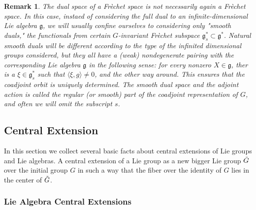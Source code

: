 \documentclass{article}
\newtheorem{rmk}{Remark}
\begin{document}
\begin{rmk}

	The dual space of a Fr\`echet space is not necessarily again a Fr\`echet space. In this case, instaed of considering the full dual to an infinite-dimensional Lie algebra $ \mathfrak{g}$, we will usually confine ourselves to considering only "smooth duals," the functionals from certain $G$-invariant Fr\`echet subspace $ \mathfrak{g}^*_s \subset \mathfrak{g}^*$. Natural smooth duals will be different according to the type of the infinited dimensional groups considered, but they all have a (weak) nondegenerate pairing with the corresponding Lie algebra $ \mathfrak{g}$ in the following sense: for every nonzero $X \in \mathfrak{g}$, ther is a $\xi \in \mathfrak{g}^*_s$ such that $\langle \xi, g \rangle \neq 0$, and the other way around. This ensures that the coadjoint orbit is uniquely determined. The smooth dual space and the adjoint action is called the regular (or smooth) part of the coadjoint representation of $G$, and often we will omit the subscript $s$.

\end{rmk}


\subsection{Central Extension}

In this section we collect several basic facts about central extensions of Lie groups and Lie algebras. A central extension of a Lie group as a new bigger Lie group $\Tilde{G}$ over the initial group $G$ in such a way that the fiber over the identity of $G$ lies in the center of $\Tilde{G}$. \\

\subsubsection{Lie Algebra Central Extensions}
\end{document}
